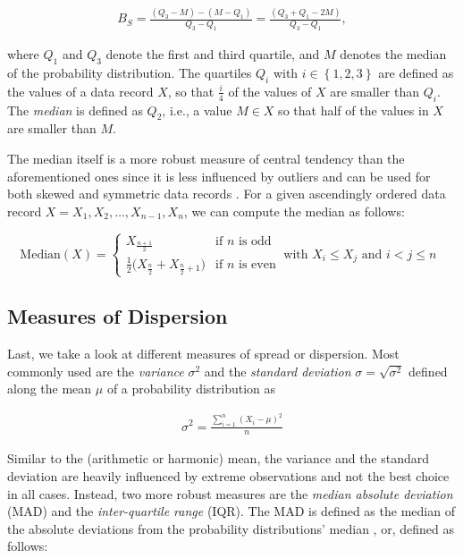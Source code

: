 \begin{equation} \label{eq:bowley}
\begin{split}
B_S = \frac{(Q_3 - M) - (M - Q_1)}{Q_3 - Q_1} = \frac{(Q_3 + Q_1 - 2M)}{Q_3
- Q_1},
\end{split}
\end{equation}

where $Q_1$ and $Q_3$ denote the first and third quartile, and $M$ denotes the
median of the probability distribution. The quartiles $Q_i$ with $i \in \left\{
1,2,3 \right\}$ are defined as the values of a data record $X$, so that
$\frac{i}{4}$ of the values of $X$ are smaller than $Q_i$. The \emph{median} is
defined as $Q_2$, i.e., a value $M \in X$ so that half of the values in $X$ are smaller than $M$.

The median itself is a more robust measure of central tendency than the
aforementioned ones since it is less influenced by outliers and can be used for
both skewed and symmetric data records \citep{shanmugam_statistics_2015}. For a
given ascendingly ordered data record $X = X_1, X_2, \ldots, X_{n-1}, X_n$, we
can compute the median as follows:

\begin{equation} \label{eq:median}
\mathrm{Median}(X) = \begin{cases}
     X_{\frac{n+1}{2}} & \text{if $n$ is odd} \\
     \frac{1}{2}\big(X_{\frac{n}{2}} + X_{\frac{n}{2}+1}\big) & \text{if $n$ is
     even}
   \end{cases}~\text{with $X_i \leq X_j$ and $i < j \leq n$ }
\end{equation}

\subsection{Measures of Dispersion}

Last, we take a look at different measures of spread or dispersion. Most
commonly used are the \emph{variance} $\sigma^2$ and the \emph{standard
deviation} $\sigma = \sqrt{\sigma^2}$ defined along the mean $\mu$ of a
probability distribution as

\begin{equation} \label{eq:variance}
\begin{split}
\sigma^2 = \frac{\sum_{i=1}^{n}(X_i - \mu)^2}{n}
\end{split}
\end{equation}

Similar to the (arithmetic or harmonic) mean, the variance and the standard
deviation are heavily influenced by extreme observations
\citep{shanmugam_statistics_2015} and not the best choice in all cases. Instead,
two more robust measures are the \emph{median absolute deviation} (MAD) and the \emph{inter-quartile range} (IQR). The MAD is defined as the median of the absolute deviations from the probability distributions'
median \citep{molyneaux_art_2014}, or, defined as follows:

